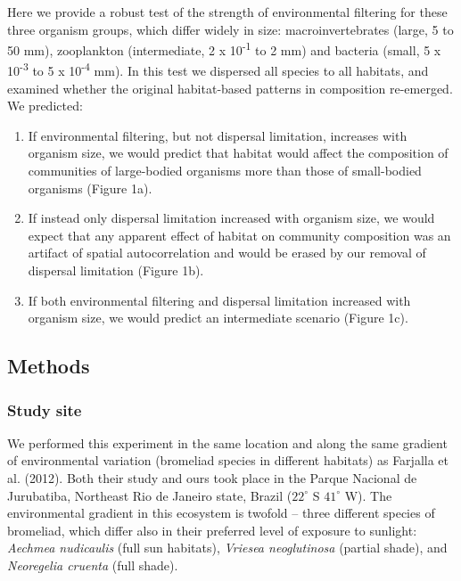 \documentclass[12pt,]{article}
\providecommand{\tightlist}{%
  \setlength{\itemsep}{0pt}\setlength{\parskip}{0pt}}
\begin{document}
Here we provide a robust test of the strength of environmental filtering
for these three organism groups, which differ widely in size:
macroinvertebrates (large, 5 to 50 mm), zooplankton (intermediate, 2 x
10\textsuperscript{-1} to 2 mm) and bacteria (small, 5 x
10\textsuperscript{-3} to 5 x 10\textsuperscript{-4} mm). In this test
we dispersed all species to all habitats, and examined whether the
original habitat-based patterns in composition re-emerged. We predicted:

\begin{enumerate}
\def\labelenumi{\arabic{enumi}.}
\tightlist
\item
  If environmental filtering, but not dispersal limitation, increases
  with organism size, we would predict that habitat would affect the
  composition of communities of large-bodied organisms more than those
  of small-bodied organisms (Figure 1a). 
\item
  If instead only dispersal limitation increased with organism size, we
  would expect that any apparent effect of habitat on community
  composition was an artifact of spatial autocorrelation and would be
  erased by our removal of dispersal limitation (Figure 1b).
\item
  If both environmental filtering and dispersal limitation increased
  with organism size, we would predict an intermediate scenario (Figure
  1c).
\end{enumerate}

\subsection{Methods}\label{methods}

\subsubsection{Study site}\label{study-site}

We performed this experiment in the same location and along the same
gradient of environmental variation (bromeliad species in different
habitats) as Farjalla et al. (2012). Both their study and ours took
place in the Parque Nacional de Jurubatiba, Northeast Rio de Janeiro
state, Brazil (\(22^{\circ}\) S \(41^{\circ}\) W). The environmental
gradient in this ecosystem is twofold -- three different species of
bromeliad, which differ also in their preferred level of exposure to
sunlight: \emph{Aechmea nudicaulis} (full sun habitats), \emph{Vriesea
neoglutinosa} (partial shade), and \emph{Neoregelia cruenta} (full
shade).
\end{document}
